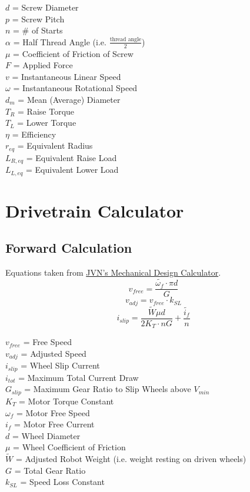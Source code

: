 \documentclass[11pt,a4paper,titlepage]{article}
\begin{document}
	$d$ = Screw Diameter \\
	$p$ = Screw Pitch \\
	$n$ = \# of Starts \\
	$\alpha$ = Half Thread Angle (i.e. $\frac{\text{thread angle}}{2}$) \\
	$\mu$ = Coefficient of Friction of Screw \\
	$F$ = Applied Force \\
	$v$ = Instantaneous Linear Speed \\
	$\omega$ = Instantaneous Rotational Speed \\
	$d_m$ = Mean (Average) Diameter \\
	$T_R$ = Raise Torque \\
	$T_L$ = Lower Torque \\
	$\eta$ = Efficiency \\
	$r_{eq}$ = Equivalent Radius \\
	$L_{R,eq}$ = Equivalent Raise Load \\
	$L_{L,eq}$ = Equivalent Lower Load
	
	\section{Drivetrain Calculator}
	\subsection{Forward Calculation}
	Equations taken from \href{https://www.chiefdelphi.com/uploads/default/original/3X/2/b/2bf9206b962f74ed5556a0ae936ef0bf365ac975.xlsx}{JVN's Mechanical Design Calculator}.
	\begin{equation} \label{v_free}
		v_{free} = \frac{\tilde{\omega_f} \cdot \pi d}{G}
	\end{equation}
	\begin{equation} \label{v_adj}
		v_{adj} = v_{free} \cdot k_{SL}
	\end{equation}
	\begin{equation}
		i_{slip} = \frac{\tilde{W} \mu d}{2 K_T \cdot n G} + \frac{\tilde{i_f}}{n}
	\end{equation}
	
	$v_{free}$ = Free Speed \\
	$v_{adj}$ = Adjusted Speed \\
	$i_{slip}$ = Wheel Slip Current \\
	$i_{tot}$ = Maximum Total Current Draw \\
	$G_{slip}$ = Maximum Gear Ratio to Slip Wheels above $V_{min}$ \\
	$K_T$ = Motor Torque Constant \\
	$\omega_f$ = Motor Free Speed \\
	$i_f$ = Motor Free Current \\
	$d$ = Wheel Diameter \\
	$\mu$ = Wheel Coefficient of Friction \\
	$\tilde{W}$ = Adjusted Robot Weight (i.e. weight resting on driven wheels) \\
	$G$ = Total Gear Ratio \\
	$k_{SL}$ = Speed Loss Constant
	
\end{document}
